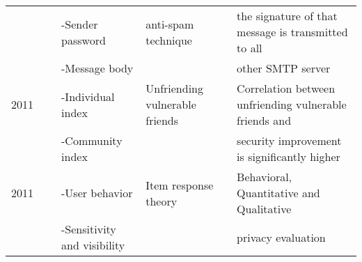 \begin{longtable}{lllll}
	\     & \                                              & -Sender password                 & anti-spam technique              & the signature of that message is transmitted to all           \\
	\     & \                                              & -Message body                    &                                  & other SMTP server                                             \\\hline
	2011  & \cite{gundecha_exploiting_2011}                & -Individual index                & Unfriending vulnerable friends   & Correlation between unfriending vulnerable friends and        \\
	\     & \                                              & -Community index                 &                                  & security improvement is significantly higher                  \\\hline
	2011  & \                                              & -User behavior                   & Item response theory             & Behavioral, Quantitative and Qualitative                      \\
	\     & \cite{maximilien_privacyasaservice_2009}       & -Sensitivity and visibility      &                                  & privacy evaluation                                            \\\hline

\end{longtable}
